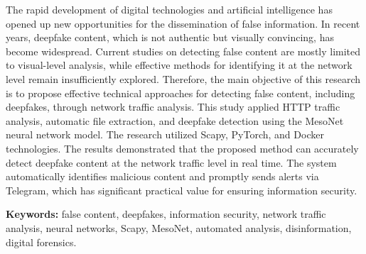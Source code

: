 The rapid development of digital technologies and artificial
intelligence has opened up new opportunities for the dissemination of
false information. In recent years, deepfake content, which is not
authentic but visually convincing, has become widespread. Current
studies on detecting false content are mostly limited to visual-level
analysis, while effective methods for identifying it at the network
level remain insufficiently explored. Therefore, the main objective of
this research is to propose effective technical approaches for detecting
false content, including deepfakes, through network traffic analysis.
This study applied HTTP traffic analysis, automatic file extraction, and
deepfake detection using the MesoNet neural network model. The research
utilized Scapy, PyTorch, and Docker technologies. The results
demonstrated that the proposed method can accurately detect deepfake
content at the network traffic level in real time. The system
automatically identifies malicious content and promptly sends alerts via
Telegram, which has significant practical value for ensuring information
security.

{\bfseries Keywords:} false content, deepfakes, information security,
network traffic analysis, neural networks, Scapy, MesoNet, automated
analysis, disinformation, digital forensics.

